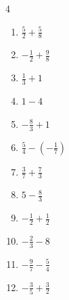 \begin{multicols}{4}
\begin{enumerate}
  \item $\displaystyle \frac{5}{2} + \frac{5}{8}$


  \item $\displaystyle -\frac{1}{2} + \frac{9}{8}$


  \item $\displaystyle \frac{1}{3} + 1$


\columnbreak %

  \item $\displaystyle 1 - 4$

        \phantom{$\displaystyle =-3$}

  \item $\displaystyle -\frac{8}{3} + 1$


  \item $\displaystyle \frac{5}{4} - \left(-\frac{1}{7}\right)$


  \item $\displaystyle \frac{3}{7} + \frac{7}{3}$


  \item $\displaystyle 5 - \frac{8}{3}$


  \item $\displaystyle -\frac{1}{2} + \frac{1}{2}$

        \phantom{$\displaystyle =0$}

  \item $\displaystyle -\frac{2}{3} - 8$


  \item $\displaystyle -\frac{9}{7} - \frac{5}{4}$


  \item $\displaystyle -\frac{3}{5} + \frac{3}{2}$



\end{enumerate}
\end{multicols}
